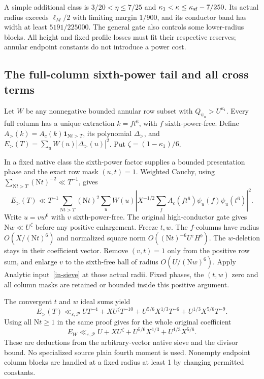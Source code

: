 \documentclass[11pt]{article}
\theoremstyle{definition}
\newcommand{\N}{\mathrm N}
\newcommand{\eps}{\varepsilon}
\newcommand{\Id}{\mathbf 1}
\newcommand{\lls}{\ll_{\eps,\mathcal P}}
\begin{document}
A simple additional class is
$3/20<\eta\le7/25$ and
$\kappa_1<\kappa\le\kappa_{\rm sf}-7/250$.
Its actual radius exceeds $\ell_M/2$ with limiting margin $1/900$,
and its conductor band has width at least $5191/225000$.
The general gate also controls some lower-radius blocks.
All height and fixed profile losses must fit their respective reserves;
annular endpoint constants do not introduce a power cost.

\subsection{The full-column sixth-power tail and all cross terms}
Let $W$ be any nonnegative bounded annular row subset with
$Q_{\psi_u}>U^{\kappa_1}$. Every full column has a unique extraction
$k=f t^6$, with $f$ sixth-power-free.
Define $A_>(k)=A_c(k)\Id_{\N t>T}$, its polynomial $\Delta_>$,
and $E_>(T)=\sum_uW(u)|\Delta_>(u)|^2$.
Put $\zeta=(1-\kappa_1)/6$.

In a fixed native class the sixth-power factor supplies a bounded
presentation phase and the exact row mask $(u,t)=1$.
Weighted Cauchy, using $\sum_{\N t>T}(\N t)^{-2}\ll T^{-1}$, gives
\[
 E_>(T)\ll T^{-1}\sum_{\N t>T}(\N t)^2
 \sum_uW(u)\left|X^{-1/2}
       \sum_f A_c(ft^6)\psi_u(f)\psi_u(t^6)\right|^2 .
\]
Write $u=v w^6$ with $v$ sixth-power-free.
The original high-conductor gate gives $\N w\ll U^\zeta$
before any positive enlargement. Freeze $t,w$.
The $f$-columns have radius $O(X/(\N t)^6)$ and normalized square norm
$O((\N t)^{-6}U^\eps H^b)$. The $w$-deletion stays in their
coefficient vector. Remove $(v,t)=1$ only from the positive row sum,
and enlarge $v$ to the sixth-free ball of radius $O(U/(\N w)^6)$.
Apply Analytic input~\ref{in-sieve} at those actual radii.
Fixed phases, the $(t,w)$ zero and all column masks are retained or
bounded inside this positive argument.

The convergent $t$ and $w$ ideal sums yield
\begin{equation}\label{fb-tail-mass}
 E_>(T)\lls
 UT^{-4}+XU^\zeta T^{-10}
 +U^{5/6}X^{1/3}T^{-6}+U^{1/3}X^{5/6}T^{-9}.
\end{equation}
Using all $\N t\ge1$ in the same proof gives for the whole original
coefficient
\begin{equation}\label{fb-full-native-mass}
 E_W\lls U+XU^\zeta+U^{5/6}X^{1/3}+U^{1/3}X^{5/6}.
\end{equation}
These are deductions from the arbitrary-vector native sieve and
the divisor bound. No specialized source plain fourth moment is used.
Nonempty endpoint column blocks are handled at a fixed radius at least
1 by changing permitted constants.
\end{document}

